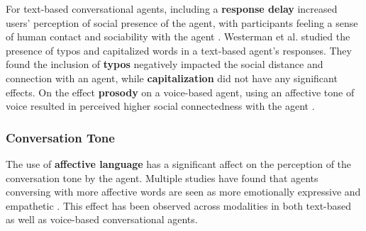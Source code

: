 \documentclass[sigconf,screen,review, anonymous]{acmart}
\newcommand{\cmt}[1]{}%
\begin{document}

For text-based conversational agents, including a \textbf{response delay} increased users' perception of social presence of the agent, with participants feeling a sense of human contact and sociability with the agent \cite{kim2020can}\cmt{[24]}. Westerman et al. \cite{westerman2019believe}\cmt{[9]} studied the presence of typos and capitalized words in a text-based agent's responses. They found the inclusion of \textbf{typos} negatively impacted the social distance and connection with an agent, while \textbf{capitalization} did not have any significant effects. On the effect \textbf{prosody} on a voice-based agent, using an affective tone of voice resulted in perceived higher social connectedness with the agent \cite{kim2020can}\cmt{[24]}.






\subsubsection{Conversation Tone}

The use of \textbf{affective language} has a significant affect on the perception of the conversation tone by the agent. Multiple studies have found that agents conversing with more affective words are seen as more emotionally expressive and empathetic \cite{daher2020empathic}\cmt{[58]}\cite{diederich2019emulating}\cmt{[25]}\cite{yang2017perceived}\cmt{[44]}\cite{zhu2022effects}\cmt{[26]}. This effect has been observed across modalities in both text-based as well as voice-based conversational agents.


\end{document}
